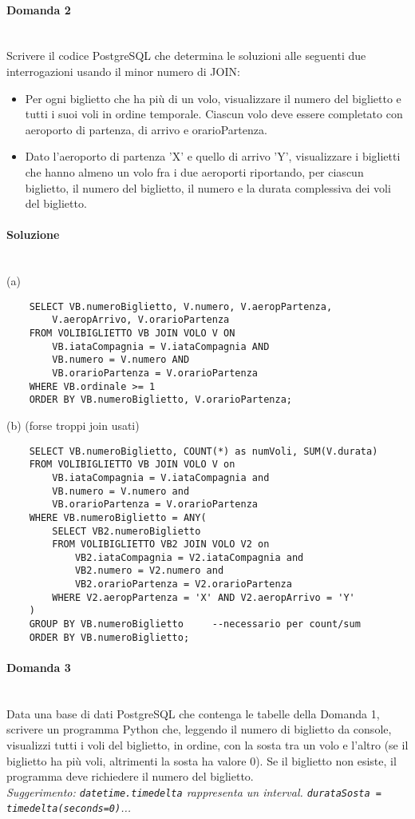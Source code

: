 \documentclass[a4paper, 10pt, titlepage]{article}
\begin{document}
\paragraph{Domanda 2}\dotfill
\\Scrivere il codice PostgreSQL che determina le soluzioni alle seguenti due interrogazioni usando il minor numero di JOIN:
\begin{itemize}
\item[(a)] Per ogni biglietto che ha più di un volo, visualizzare il numero del biglietto e tutti i suoi voli in ordine temporale. Ciascun volo deve essere completato con aeroporto di partenza, di arrivo e orarioPartenza.
\item[(b)] Dato l'aeroporto di partenza 'X' e quello di arrivo 'Y', visualizzare i biglietti che hanno almeno un volo fra i due aeroporti riportando, per ciascun biglietto, il numero del biglietto, il numero e la durata complessiva dei voli del biglietto.
\end{itemize}

\paragraph{Soluzione}\dotfill
\\(a) 
\begin{lstlisting}
	SELECT VB.numeroBiglietto, V.numero, V.aeropPartenza,
		V.aeropArrivo, V.orarioPartenza
	FROM VOLIBIGLIETTO VB JOIN VOLO V ON 
		VB.iataCompagnia = V.iataCompagnia AND 
		VB.numero = V.numero AND 
		VB.orarioPartenza = V.orarioPartenza
	WHERE VB.ordinale >= 1
	ORDER BY VB.numeroBiglietto, V.orarioPartenza;
\end{lstlisting}
(b) (forse troppi join usati)
\begin{lstlisting}
	SELECT VB.numeroBiglietto, COUNT(*) as numVoli, SUM(V.durata)
	FROM VOLIBIGLIETTO VB JOIN VOLO V on
 	 	VB.iataCompagnia = V.iataCompagnia and
 		VB.numero = V.numero and
 		VB.orarioPartenza = V.orarioPartenza
	WHERE VB.numeroBiglietto = ANY(
  		SELECT VB2.numeroBiglietto
  		FROM VOLIBIGLIETTO VB2 JOIN VOLO V2 on
    		VB2.iataCompagnia = V2.iataCompagnia and
    		VB2.numero = V2.numero and
    		VB2.orarioPartenza = V2.orarioPartenza
  		WHERE V2.aeropPartenza = 'X' AND V2.aeropArrivo = 'Y'
  	)
	GROUP BY VB.numeroBiglietto		--necessario per count/sum
	ORDER BY VB.numeroBiglietto;
\end{lstlisting}

\paragraph{Domanda 3}\dotfill
\\Data una base di dati PostgreSQL che contenga le tabelle della Domanda 1, scrivere un programma Python che, leggendo il numero di biglietto da console, visualizzi tutti i voli del biglietto, in ordine, con la sosta tra un volo e l'altro (se il biglietto ha più voli, altrimenti la sosta ha valore 0). Se il biglietto non esiste, il programma deve richiedere il numero del biglietto.\\
{\small \textit{Suggerimento: \lstinline|datetime.timedelta| rappresenta un interval. \lstinline|durataSosta = timedelta(seconds=0)|...} }
\end{document}
